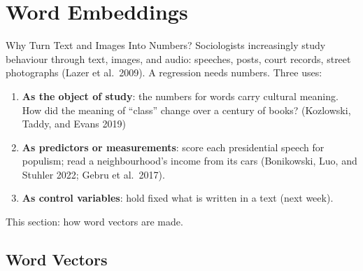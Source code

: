 \documentclass[aspectratio=169,11pt,xcolor=dvipsnames]{beamer}
\newcommand{\srcp}[1]{{\scriptsize\color{gray}(#1)}}
\begin{document}
\section[Word Embeddings]{Word Embeddings}
\begin{frame}\sectionpage\end{frame}

\begin{frame}{Why Turn Text and Images Into Numbers?}
Sociologists increasingly study behaviour through text, images, and audio: speeches,
posts, court records, street photographs \srcp{Lazer et al.\ 2009}. A regression needs
numbers. Three uses:
\vskip3pt
\begin{enumerate}\itemsep4pt
  \item \textbf{As the object of study}: the numbers for words carry cultural meaning.
        How did the meaning of ``class'' change over a century of books?
        \srcp{Kozlowski, Taddy, and Evans 2019}
  \item \textbf{As predictors or measurements}: score each presidential speech for
        populism; read a neighbourhood's income from its cars
        \srcp{Bonikowski, Luo, and Stuhler 2022; Gebru et al.\ 2017}.
  \item \textbf{As control variables}: hold fixed what is written in a text (next week).
\end{enumerate}
{\small This section: how word vectors are made.}
\end{frame}

\subsection{Word Vectors}
\end{document}
